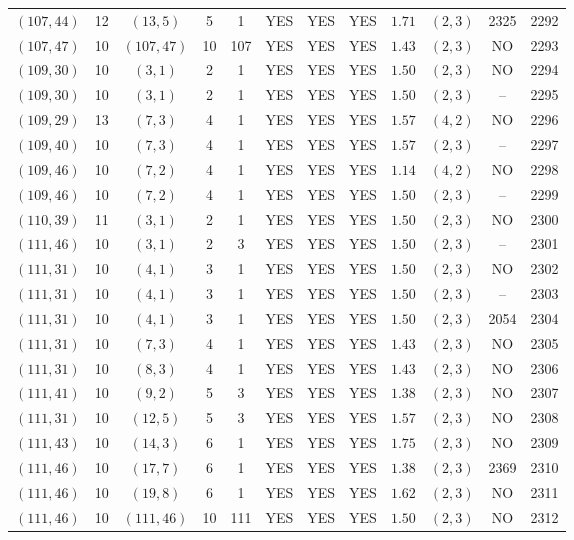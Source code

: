 \begin{longtable}{|c|c|c|c|c|c|c|c|c|c|c|c|}
$(107,44)$ & 12 & $(13,5)$ & 5 & 1 & YES & YES & YES & $1.71$ & $(2,3)$ & 2325 & 2292\\
$(107,47)$ & 10 & $(107,47)$ & 10 & 107 & YES & YES & YES & $1.43$ & $(2,3)$ & NO & 2293\\
$(109,30)$ & 10 & $(3,1)$ & 2 & 1 & YES & YES & YES & $1.50$ & $(2,3)$ & NO & 2294\\
$(109,30)$ & 10 & $(3,1)$ & 2 & 1 & YES & YES & YES & $1.50$ & $(2,3)$ & -- & 2295\\
$(109,29)$ & 13 & $(7,3)$ & 4 & 1 & YES & YES & YES & $1.57$ & $(4,2)$ & NO & 2296\\
$(109,40)$ & 10 & $(7,3)$ & 4 & 1 & YES & YES & YES & $1.57$ & $(2,3)$ & -- & 2297\\
$(109,46)$ & 10 & $(7,2)$ & 4 & 1 & YES & YES & YES & $1.14$ & $(4,2)$ & NO & 2298\\
$(109,46)$ & 10 & $(7,2)$ & 4 & 1 & YES & YES & YES & $1.50$ & $(2,3)$ & -- & 2299\\
$(110,39)$ & 11 & $(3,1)$ & 2 & 1 & YES & YES & YES & $1.50$ & $(2,3)$ & NO & 2300\\
$(111,46)$ & 10 & $(3,1)$ & 2 & 3 & YES & YES & YES & $1.50$ & $(2,3)$ & -- & 2301\\
$(111,31)$ & 10 & $(4,1)$ & 3 & 1 & YES & YES & YES & $1.50$ & $(2,3)$ & NO & 2302\\
$(111,31)$ & 10 & $(4,1)$ & 3 & 1 & YES & YES & YES & $1.50$ & $(2,3)$ & -- & 2303\\
$(111,31)$ & 10 & $(4,1)$ & 3 & 1 & YES & YES & YES & $1.50$ & $(2,3)$ & 2054 & 2304\\
$(111,31)$ & 10 & $(7,3)$ & 4 & 1 & YES & YES & YES & $1.43$ & $(2,3)$ & NO & 2305\\
$(111,31)$ & 10 & $(8,3)$ & 4 & 1 & YES & YES & YES & $1.43$ & $(2,3)$ & NO & 2306\\
$(111,41)$ & 10 & $(9,2)$ & 5 & 3 & YES & YES & YES & $1.38$ & $(2,3)$ & NO & 2307\\
$(111,31)$ & 10 & $(12,5)$ & 5 & 3 & YES & YES & YES & $1.57$ & $(2,3)$ & NO & 2308\\
$(111,43)$ & 10 & $(14,3)$ & 6 & 1 & YES & YES & YES & $1.75$ & $(2,3)$ & NO & 2309\\
$(111,46)$ & 10 & $(17,7)$ & 6 & 1 & YES & YES & YES & $1.38$ & $(2,3)$ & 2369 & 2310\\
$(111,46)$ & 10 & $(19,8)$ & 6 & 1 & YES & YES & YES & $1.62$ & $(2,3)$ & NO & 2311\\
$(111,46)$ & 10 & $(111,46)$ & 10 & 111 & YES & YES & YES & $1.50$ & $(2,3)$ & NO & 2312\\

\end{longtable}
